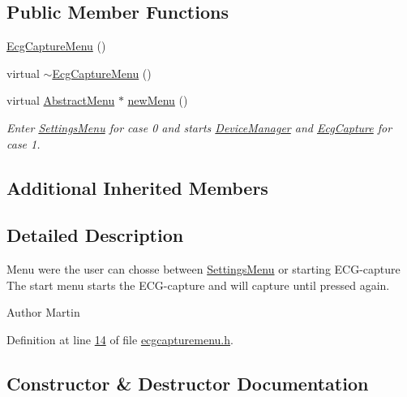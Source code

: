 \subsection*{Public Member Functions}
\begin{DoxyCompactItemize}
\item 
\hyperlink{classEcgCaptureMenu_ac430bc0a2eb1879fe77cd0133d4dd704}{Ecg\+Capture\+Menu} ()
\item 
virtual \hyperlink{classEcgCaptureMenu_ac779737a084cb49d1517974543d4965b}{$\sim$\+Ecg\+Capture\+Menu} ()
\item 
virtual \hyperlink{classAbstractMenu}{Abstract\+Menu} $\ast$ \hyperlink{classEcgCaptureMenu_a610d2985e09cd56cb381e6e443dbbc72}{new\+Menu} ()
\begin{DoxyCompactList}\small\item\em Enter \hyperlink{classSettingsMenu}{Settings\+Menu} for case 0 and starts \hyperlink{classDeviceManager}{Device\+Manager} and \hyperlink{classEcgCapture}{Ecg\+Capture} for case 1. \end{DoxyCompactList}\end{DoxyCompactItemize}
\subsection*{Additional Inherited Members}


\subsection{Detailed Description}
Menu were the user can chosse between \hyperlink{classSettingsMenu}{Settings\+Menu} or starting E\+C\+G-\/capture The start menu starts the E\+C\+G-\/capture and will capture until pressed again. 

\begin{DoxyAuthor}{Author}
Martin 
\end{DoxyAuthor}


Definition at line \hyperlink{ecgcapturemenu_8h_source_l00014}{14} of file \hyperlink{ecgcapturemenu_8h_source}{ecgcapturemenu.\+h}.



\subsection{Constructor \& Destructor Documentation}
